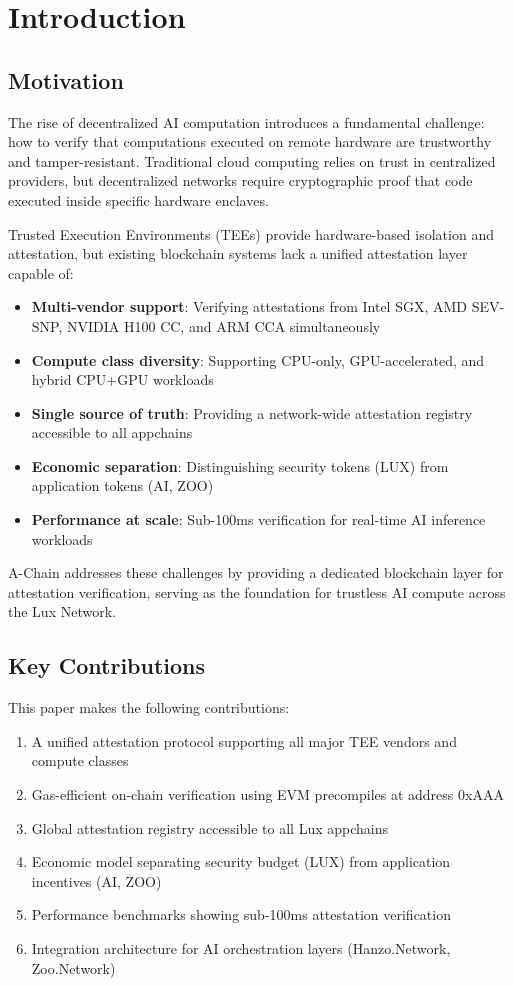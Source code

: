 \section{Introduction}


\subsection{Motivation}

The rise of decentralized AI computation introduces a fundamental challenge: how to verify that computations executed on remote hardware are trustworthy and tamper-resistant. Traditional cloud computing relies on trust in centralized providers, but decentralized networks require cryptographic proof that code executed inside specific hardware enclaves.

Trusted Execution Environments (TEEs) provide hardware-based isolation and attestation, but existing blockchain systems lack a unified attestation layer capable of:

\begin{itemize}
\item \textbf{Multi-vendor support}: Verifying attestations from Intel SGX, AMD SEV-SNP, NVIDIA H100 CC, and ARM CCA simultaneously
\item \textbf{Compute class diversity}: Supporting CPU-only, GPU-accelerated, and hybrid CPU+GPU workloads
\item \textbf{Single source of truth}: Providing a network-wide attestation registry accessible to all appchains
\item \textbf{Economic separation}: Distinguishing security tokens (LUX) from application tokens (AI, ZOO)
\item \textbf{Performance at scale}: Sub-100ms verification for real-time AI inference workloads
\end{itemize}

A-Chain addresses these challenges by providing a dedicated blockchain layer for attestation verification, serving as the foundation for trustless AI compute across the Lux Network.

\subsection{Key Contributions}

This paper makes the following contributions:

\begin{enumerate}
\item A unified attestation protocol supporting all major TEE vendors and compute classes
\item Gas-efficient on-chain verification using EVM precompiles at address 0xAAA
\item Global attestation registry accessible to all Lux appchains
\item Economic model separating security budget (LUX) from application incentives (AI, ZOO)
\item Performance benchmarks showing sub-100ms attestation verification
\item Integration architecture for AI orchestration layers (Hanzo.Network, Zoo.Network)
\end{enumerate}

